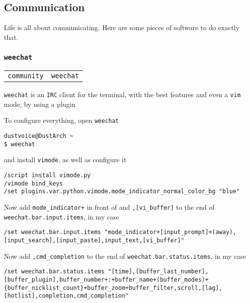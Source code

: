 \documentclass[9pt]{report}
\newenvironment{packagetable}
{\begin{longtabu}to \textwidth [b]{X[1,r]|X[1,l]}}
{\end{longtabu}}
\begin{document}
\newpage

\hypertarget{x-communication}{\subsection{Communication}}
Life is all about communicating.
Here are some pieces of software to do exactly that.



\newpage

\hypertarget{x-weechat}{\subsubsection{\texttt{weechat}}}
\begin{packagetable}
    \texttt{community} & \texttt{weechat} \\ 
\end{packagetable}

\texttt{weechat} is an \texttt{IRC} client for the terminal, with the best features and even a \texttt{vim} mode, by using a plugin


To configure everything, open \texttt{weechat}


\begin{verbatim}
dustvoice@DustArch ~
$ weechat
\end{verbatim}

and install \texttt{vimode}, as well as configure it


\begin{verbatim}
/script install vimode.py
/vimode bind_keys
/set plugins.var.python.vimode.mode_indicator_normal_color_bg "blue"
\end{verbatim}

Now add \texttt{mode\_indicator+} in front of and \texttt{,[vi\_buffer]} to the end of \texttt{weechat.bar.input.items}, in my case


\begin{verbatim}
/set weechat.bar.input.items "mode_indicator+[input_prompt]+(away),[input_search],[input_paste],input_text,[vi_buffer]"
\end{verbatim}

Now add \texttt{,cmd\_completion} to the end of \texttt{weechat.bar.status.items}, in my case


\begin{verbatim}
/set weechat.bar.status.items "[time],[buffer_last_number],[buffer_plugin],buffer_number+:+buffer_name+(buffer_modes)+{buffer_nicklist_count}+buffer_zoom+buffer_filter,scroll,[lag],[hotlist],completion,cmd_completion"
\end{verbatim}
\end{document}
